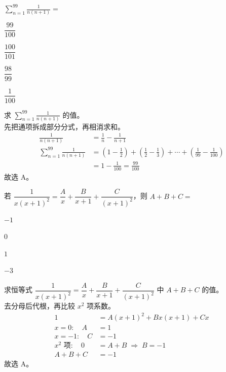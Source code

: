 \documentclass{exam-zh}
\begin{document}
\begin{question}
    $\displaystyle\sum_{n=1}^{99}\frac{1}{n(n+1)}=$ \paren[A]
    \begin{choices}
        \item $\dfrac{99}{100}$
        \item $\dfrac{100}{101}$
        \item $\dfrac{98}{99}$
        \item $\dfrac{1}{100}$
    \end{choices}
\end{question}

\begin{solution}
    求 $\displaystyle\sum_{n=1}^{99}\frac{1}{n(n+1)}$ 的值。 \\
    先把通项拆成部分分式，再相消求和。
    \begin{align*}
        \frac{1}{n(n+1)} &= \frac1n-\frac1{n+1} \\
        \sum_{n=1}^{99}\frac{1}{n(n+1)} &= \left(1-\frac12\right)+\left(\frac12-\frac13\right)+\cdots+\left(\frac1{99}-\frac1{100}\right) \\
        &= 1-\frac1{100} = \frac{99}{100}
    \end{align*}
    故选 A。
\end{solution}

\begin{question}
    若 $\dfrac{1}{x(x+1)^2}=\dfrac{A}{x}+\dfrac{B}{x+1}+\dfrac{C}{(x+1)^2}$，则 $A+B+C=$ \paren[A]
    \begin{choices}
        \item $-1$
        \item $0$
        \item $1$
        \item $-3$
    \end{choices}
\end{question}

\begin{solution}
    求恒等式 $\dfrac{1}{x(x+1)^2}=\dfrac{A}{x}+\dfrac{B}{x+1}+\dfrac{C}{(x+1)^2}$ 中 $A+B+C$ 的值。 \\
    去分母后代根，再比较 $x^2$ 项系数。
    \begin{align*}
        1 &= A(x+1)^2+Bx(x+1)+Cx \\
        x=0:\quad A &= 1 \\
        x=-1:\quad C &= -1 \\
        x^2\text{ 项}:\quad 0 &= A+B \;\Rightarrow\; B=-1 \\
        A+B+C &= -1
    \end{align*}
    故选 A。
\end{solution}
\end{document}
